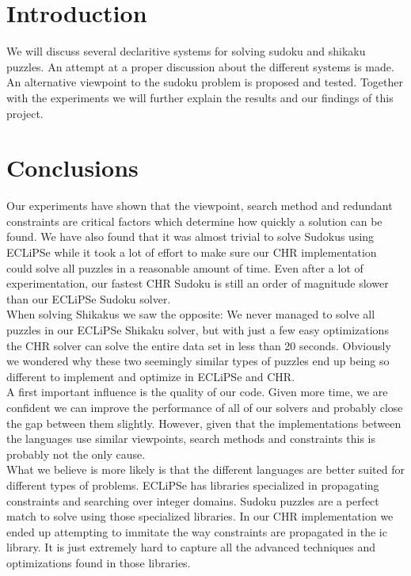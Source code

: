 \documentclass[a4paper,10pt]{article}
\begin{document}



\tableofcontents

\newpage
\section{Introduction}
We will discuss several declaritive systems for solving sudoku and shikaku puzzles.
An attempt at a proper discussion about the different systems is made.
An alternative viewpoint to the sudoku problem is proposed and tested.
Together with the experiments we will further explain the results and our findings of this project.


\newpage



\newpage
\section{Conclusions}
Our experiments have shown that the viewpoint, search method and redundant constraints are critical factors which determine how quickly a solution can be found. We have also found that it was almost trivial to solve Sudokus using ECLiPSe while it took a lot of effort to make sure our CHR implementation could solve all puzzles in a reasonable amount of time. Even after a lot of experimentation, our fastest CHR Sudoku is still an order of magnitude slower than our ECLiPSe Sudoku solver. \\

When solving Shikakus we saw the opposite: We never managed to solve all puzzles in our ECLiPSe Shikaku solver, but with just a few easy optimizations the CHR solver can solve the entire data set in less than 20 seconds. Obviously we wondered why these two seemingly similar types of puzzles end up being so different to implement and optimize in ECLiPSe and CHR. \\ 

A first important influence is the quality of our code. Given more time, we are confident we can improve the performance of all of our solvers and probably close the gap between them slightly. However, given that the implementations between the languages use similar viewpoints, search methods and constraints this is probably not the only cause. \\
What we believe is more likely is that the different languages are better suited for different types of problems. ECLiPSe has libraries specialized in propagating constraints and searching over integer domains. Sudoku puzzles are a perfect match to solve using those specialized libraries. In our CHR implementation we ended up attempting to immitate the way constraints are propagated in the ic library. It is just extremely hard to capture all the advanced techniques and optimizations found in those libraries. \\
\end{document}
